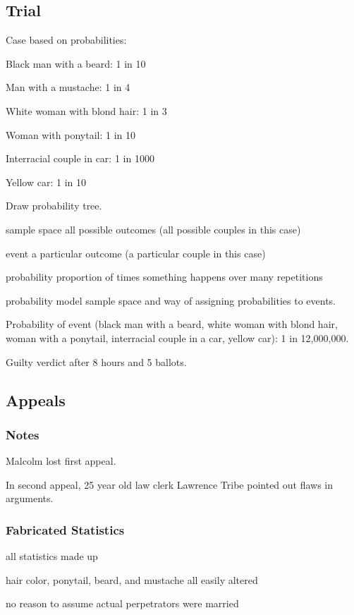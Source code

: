 \documentclass[letterpaper, landscape]{exam}
\begin{document}
  \subsection{Trial}
  Case based on probabilities:
  \begin{itemize*}
    \item Black man with a beard: 1 in 10
    \item Man with a mustache: 1 in 4
    \item White woman with blond hair: 1 in 3
    \item Woman with ponytail: 1 in 10
    \item Interracial couple in car: 1 in 1000
    \item Yellow car: 1 in 10
  \end{itemize*}

  Draw probability tree.

  \begin{description*}
    \item[sample space] all possible outcomes (all possible couples in this case)
    \item[event] a particular outcome (a particular couple in this case)
    \item[probability] proportion of times something happens over many repetitions
    \item[probability model] sample space and way of assigning probabilities to events. 
  \end{description*}


  Probability of event (black man with a beard, white woman with blond hair,
  woman with a ponytail, interracial couple in a car, yellow car): 1 in 12,000,000.

  Guilty verdict after 8 hours and 5 ballots.

  \subsection{Appeals}

  \subsubsection{Notes}
  Malcolm lost first appeal.

  In second appeal, 25 year old law clerk Lawrence Tribe pointed out flaws in
  arguments.

  \subsubsection{Fabricated Statistics}
  \begin{itemize*}
    \item all statistics made up
    \item hair color, ponytail, beard, and mustache all easily altered
    \item no reason to assume actual perpetrators were married 
  \end{itemize*}
\end{document}
